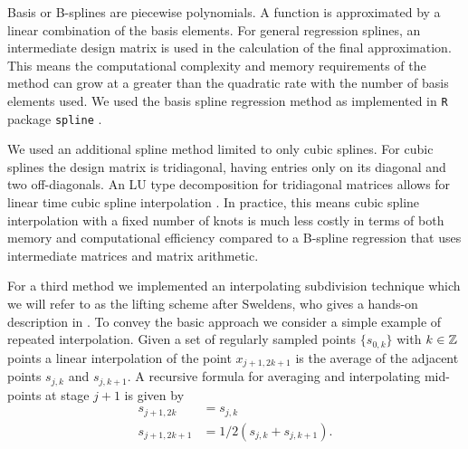 Basis or B-splines are piecewise polynomials. 
A function is approximated by a linear combination of the basis elements. For general regression splines, an intermediate
design matrix is used in the calculation of the final approximation. 
This means the computational complexity and memory requirements of the method can grow at a greater than the quadratic rate with the number of basis elements used. We used the 
basis spline regression method as implemented in \texttt{R} package \texttt{spline} \cite{racine}\cite{baseR}. 

We used an additional spline method limited to only 
cubic splines. For cubic splines the design matrix is tridiagonal, having entries only on its diagonal and two off-diagonals. An LU type decomposition for tridiagonal matrices allows for linear time cubic spline interpolation \cite{dahlquist08}. In practice, this means cubic spline interpolation with a fixed number of knots is much less costly in terms of both memory and computational efficiency compared to a B-spline regression that uses 
intermediate matrices and matrix arithmetic.

For a third method we implemented an interpolating 
subdivision technique which we will refer to 
as the lifting scheme after Sweldens, who gives
a hands-on description in \cite{sweldens1996}. To 
convey the basic approach we consider a simple 
example of repeated interpolation. Given a set 
of regularly sampled points $\{ s_{0,k} \}$ with 
$k \in \mathbb{Z}$ points a linear interpolation of the 
point $x_{j+1, 2k + 1}$ is the average of the 
adjacent points $s_{j,k}$ and $s_{j,k+1}$. A
recursive formula for averaging and interpolating 
mid-points at stage $j+1$ is given by
\begin{align*}
      s_{j+1, 2k} &= s_{j,k} \\
      s_{j + 1, 2k+1} &= 1/2(s_{j,k} + s_{j,k+1}).
 \end{align*}

